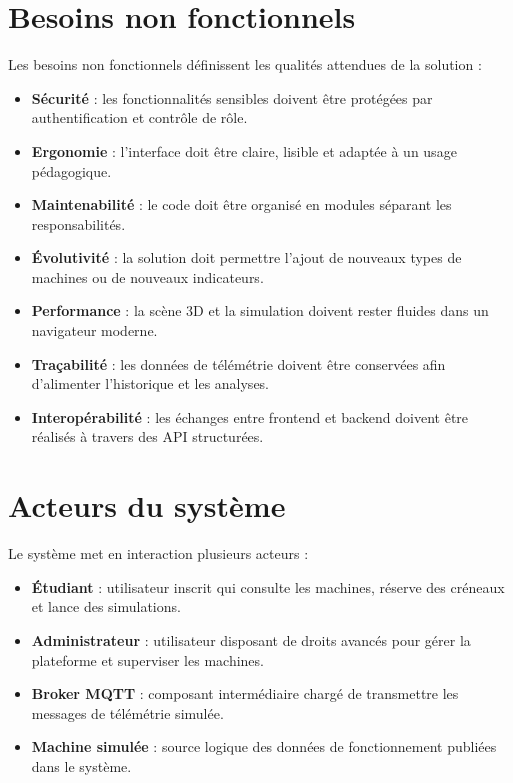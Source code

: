 \section{Besoins non fonctionnels}

Les besoins non fonctionnels définissent les qualités attendues de la solution :

\begin{itemize}
    \item \textbf{Sécurité} : les fonctionnalités sensibles doivent être protégées par authentification et contrôle de rôle.
    \item \textbf{Ergonomie} : l’interface doit être claire, lisible et adaptée à un usage pédagogique.
    \item \textbf{Maintenabilité} : le code doit être organisé en modules séparant les responsabilités.
    \item \textbf{Évolutivité} : la solution doit permettre l’ajout de nouveaux types de machines ou de nouveaux indicateurs.
    \item \textbf{Performance} : la scène 3D et la simulation doivent rester fluides dans un navigateur moderne.
    \item \textbf{Traçabilité} : les données de télémétrie doivent être conservées afin d’alimenter l’historique et les analyses.
    \item \textbf{Interopérabilité} : les échanges entre frontend et backend doivent être réalisés à travers des API structurées.
\end{itemize}

\section{Acteurs du système}

Le système met en interaction plusieurs acteurs :

\begin{itemize}
    \item \textbf{Étudiant} : utilisateur inscrit qui consulte les machines, réserve des créneaux et lance des simulations.
    \item \textbf{Administrateur} : utilisateur disposant de droits avancés pour gérer la plateforme et superviser les machines.
    \item \textbf{Broker MQTT} : composant intermédiaire chargé de transmettre les messages de télémétrie simulée.
    \item \textbf{Machine simulée} : source logique des données de fonctionnement publiées dans le système.
\end{itemize}


